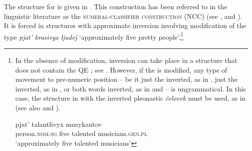 \documentclass[output=paper,modfonts,newtxmath,hidelinks]{langscibook}
\begin{document}
\noindent The structure for  is given in . This construction has been referred to in the linguistic literature as the \textsc{numeral-classifier construction} (NCC) (see \citealt{Sussex1976}, \citealt{Yadroff1999} and \citealt{Pesetsky2013}). It is forced in structures with approximate inversion involving modification of the type \textit{ pjat’ krasivyx ljudej} `approximately five pretty people'.\footnote{\label{18:fn11}In the absence of modification, inversion can take place in a structure that does not contain the QE \textit{;} see . However, if the  is modified, any type of movement to pre-numeric position -- be it just the  inverted, as in , just the  inverted, as in , or both words inverted, as in  and  -- is ungrammatical. In this case, the structure in  with the inverted pleonastic  \textit{čelovek} must be used, as in  (see also \citealt{Melčuk1985} and \citealt{Yadroff1999}).%
\begin{multicols}{2}
\ea \label{18:fn11i}
	\label{18:fn11ia}\columnbreak
    \label{18:fn11ib}
    \z
\z
\end{multicols}

\begin{multicols}{2}
\ea \label{18:fn11ii}
	\columnbreak
    \label{18:fn11iib}
    \label{18:fn11iic}
    \label{18:fn11iid}
    \label{18:fn11iie}
    \z
\z
\end{multicols}
\ea \label{18:fn11iii}
    \gll {}    pjat’  talantlivyx  muzykantov\\
    	 person.\textsc{nom.sg}   five  talented    musicians.\textsc{gen.pl}\\
         \glt `approximately five talented musicians'
\z 
}
\end{document}
